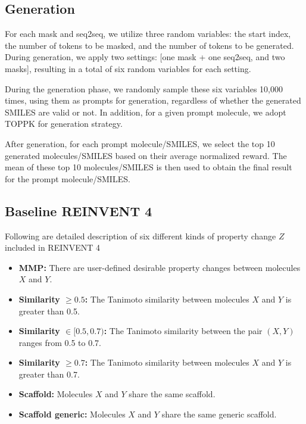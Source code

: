 {\subsection{Generation}\label{app:generation}



For each mask and seq2seq, we utilize three random variables: the start index, the number of tokens to be masked, and the number of tokens to be generated. During generation, we apply two settings: [one mask + one seq2seq, and two masks], resulting in a total of six random variables for each setting.

During the generation phase, we randomly sample these six variables 10,000 times, using them as prompts for generation, regardless of whether the generated SMILES are valid or not. In addition, for a given prompt molecule, we adopt TOPPK \citep{liu2024erp} for generation strategy.

After generation, for each prompt molecule/SMILES, we select the top 10 generated molecules/SMILES based on their average normalized reward. The mean of these top 10 molecules/SMILES is then used to obtain the final result for the prompt molecule/SMILES.

 }


{\subsection{Baseline REINVENT 4} \label{app:reinvent}
Following are detailed description of six different kinds of property change $Z$ included in REINVENT 4 \citet{he2022transformer, he2021molecular}
\begin{itemize}[itemsep=0pt,parsep=0pt,topsep=0pt,partopsep=0pt]
    \item \textbf{MMP:} There are user-defined desirable property changes between molecules $X$ and $Y$.
    \item \textbf{Similarity $\geq 0.5$:} The Tanimoto similarity between molecules $X$ and $Y$ is greater than 0.5.
    \item \textbf{Similarity $\in[0.5, 0.7)$:} The Tanimoto similarity between the pair $\left(X,Y\right)$ ranges from 0.5 to 0.7.
    \item \textbf{Similarity $\geq 0.7$:} The Tanimoto similarity between molecules $X$ and $Y$ is greater than 0.7.
    \item \textbf{Scaffold:} Molecules $X$ and $Y$ share the same scaffold.
    \item \textbf{Scaffold generic:} Molecules $X$ and $Y$ share the same generic scaffold.
\end{itemize}}

